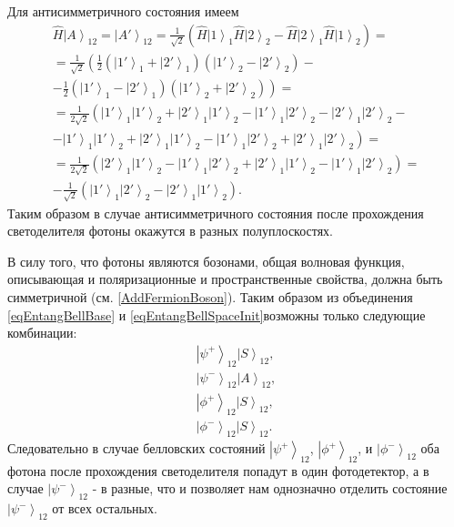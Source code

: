 Для антисимметричного состояния имеем
\begin{eqnarray}
\hat{H}\left|A\right>_{12} = \left|A'\right>_{12} = 
\frac{1}{\sqrt{2}}
\left(
\hat{H}\left|1\right>_1\hat{H}\left|2\right>_2 -
\hat{H}\left|2\right>_1\hat{H}\left|1\right>_2
\right) = 
\nonumber \\
=
\frac{1}{\sqrt{2}}
\left(
\frac{1}{2}
\left(\left|1'\right>_1 +
\left|2'\right>_1\right)
\left(\left|1'\right>_2 -
\left|2'\right>_2\right) -
\right.
\nonumber \\
- \left.
\frac{1}{2}
\left(\left|1'\right>_1 -
\left|2'\right>_1\right)
\left(\left|1'\right>_2 +
\left|2'\right>_2\right)
\right) = 
\nonumber \\
=
\frac{1}{2 \sqrt{2}}
\left(
\left|1'\right>_1 \left|1'\right>_2 +
\left|2'\right>_1 \left|1'\right>_2 -
\left|1'\right>_1 \left|2'\right>_2 -
\left|2'\right>_1 \left|2'\right>_2 -
\right. 
\nonumber \\
- \left.
\left|1'\right>_1 \left|1'\right>_2 +
\left|2'\right>_1 \left|1'\right>_2 -
\left|1'\right>_1 \left|2'\right>_2 +
\left|2'\right>_1 \left|2'\right>_2
\right) =
\nonumber \\
=
\frac{1}{2 \sqrt{2}}
\left(
\left|2'\right>_1 \left|1'\right>_2 
- \left|1'\right>_1 \left|2'\right>_2 
+ \left|2'\right>_1 \left|1'\right>_2 
- \left|1'\right>_1 \left|2'\right>_2
\right) = 
\nonumber \\
- \frac{1}{\sqrt{2}}
\left(
\left|1'\right>_1 \left|2'\right>_2 
- \left|2'\right>_1 \left|1'\right>_2 
\right).
\nonumber
\end{eqnarray}
Таким образом в случае антисимметричного состояния после прохождения
светоделителя фотоны окажутся в разных полуплоскостях.

В силу того, что фотоны являются бозонами, 
общая волновая функция,
описывающая и поляризационные и пространственные свойства,
должна быть симметричной \cite{bFeinman}
(см. \autoref{AddFermionBoson}). Таким образом из объединения 
\eqref{eqEntangBellBase} и \eqref{eqEntangBellSpaceInit}возможны
только следующие комбинации:
\begin{eqnarray}
\left|\psi^{+}\right>_{12}\left|S\right>_{12},
\nonumber \\ 
\left|\psi^{-}\right>_{12}\left|A\right>_{12}, 
\nonumber \\ 
\left|\phi^{+}\right>_{12}\left|S\right>_{12}, 
\nonumber \\ 
\left|\phi^{-}\right>_{12}\left|S\right>_{12}.
\nonumber
\end{eqnarray}
Следовательно в случае белловских состояний 
$\left|\psi^{+}\right>_{12}$, $\left|\phi^{+}\right>_{12}$, и
$\left|\phi^{-}\right>_{12}$ оба фотона после прохождения
светоделителя попадут в один фотодетектор, а в случае
$\left|\psi^{-}\right>_{12}$ - в разные, что и позволяет нам
однозначно отделить состояние $\left|\psi^{-}\right>_{12}$ от всех
остальных. 

